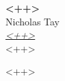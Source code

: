 \documentclass{article}
\newcommand{\metatitle}{<++>}
\newcommand{\metaauthor}{Nicholas Tay}
\newcommand{\metaemail}{<++>}
\newcommand{\metadate}{<++>}
\begin{document}
\thispagestyle{empty}
\begin{center}
	\Large{\textbf{\metatitle{}}} \\ \large{\metaauthor{} \\ \href{mailto:\metaemail{}}{\small \textit{\metaemail{}}} \\ \metadate{}}
\end{center}

<++>
\end{document}

